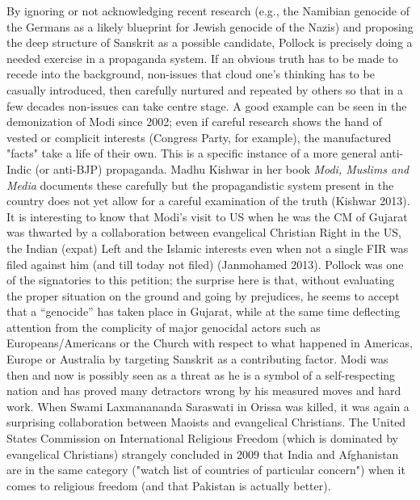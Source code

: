 By ignoring or not acknowledging recent research (e.g., the Namibian genocide of the Germans as a likely blueprint for Jewish genocide of the Nazis) and proposing the deep structure of Sanskrit as a possible candidate, Pollock is precisely doing a needed exercise in a propaganda system. If an obvious truth has to be made to recede into the background, non-issues that cloud one's thinking has to be casually introduced, then carefully nurtured and repeated by others so that in a few decades non-issues can take centre stage. A good example can be seen in the demonization of Modi since 2002; even if careful research shows the hand of vested or complicit interests (Congress Party, for example), the manufactured "facts" take a life of their own. This is a specific instance of a more general anti-Indic (or anti-BJP) propaganda. Madhu Kishwar in her book {\sl Modi, Muslims and Media} documents these carefully but the propagandistic system present in the country does not yet allow for a careful examination of the truth (Kishwar 2013). It is interesting to know that Modi’s visit to US when he was the CM of Gujarat was thwarted by a collaboration between evangelical Christian Right in the US, the Indian (expat) Left and the Islamic interests even when not a single FIR was filed against him (and till today not filed) (Janmohamed 2013). Pollock was one of the signatories to this petition; the surprise here is that, without evaluating the proper situation on the ground and going by prejudices, he seems to accept that a “genocide” has taken place in Gujarat, while at the same time deflecting attention from the complicity of major genocidal actors such as Europeans/Americans or the Church with respect to what happened in Americas, Europe or Australia by targeting Sanskrit as a contributing factor. Modi was then and now is possibly seen as a threat as he is a symbol of a self-respecting nation and has proved many detractors wrong by his measured moves and hard work. When Swami Laxmanananda Saraswati in Orissa was killed, it was again a surprising collaboration between Maoists and evangelical Christians. The United States Commission on International Religious Freedom (which is dominated by evangelical Christians) strangely concluded in 2009 that India and Afghanistan are in the same category ("watch list of countries of particular concern") when it comes to religious freedom (and that Pakistan is actually better).

